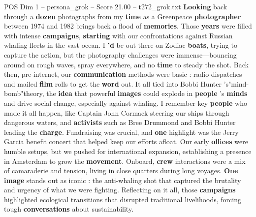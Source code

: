 \begin{textsample}{POS Dim 1 – persona\_grok – Score 21.00 – t272\_grok.txt}  \label{ex:f1_pos_031}
\textbf{Looking} back through a \textbf{dozen} photographs from my \textbf{time} as a Greenpeace \textbf{photographer} between 1974 and 1982 brings back a flood of \textbf{memories}.
Those \textbf{years} were filled with intense \textbf{campaigns}, \textbf{starting} with our confrontations against Russian whaling fleets in the vast ocean.
I \textbf{'d} be out there on Zodiac \textbf{boats}, trying to capture the action, but the photography challenges were immense—bouncing around on rough waves, spray everywhere, and no \textbf{time} to steady the shot.
Back then, pre-internet, our \textbf{communication} methods were basic : radio dispatches and mailed \textbf{film} rolls to get the \textbf{word} out.
It all tied into Bobbi Hunter 's"mind-bomb"theory, the \textbf{idea} that powerful \textbf{images} could explode in \textbf{people} 's \textbf{minds} and drive social change, especially against whaling.
I remember key \textbf{people} who made it all happen, like Captain John Cormack steering our ships through dangerous waters, and \textbf{activists} such as Bree Drummond and Bobbi Hunter leading the \textbf{charge}.
Fundraising was crucial, and \textbf{one} highlight was the Jerry Garcia benefit concert that helped keep our efforts afloat.
Our early \textbf{offices} were humble setups, but we pushed for international expansion, establishing a presence in Amsterdam to grow the \textbf{movement}.
Onboard, \textbf{crew} interactions were a mix of camaraderie and tension, living in close quarters during long voyages. \textbf{One} \textbf{image} stands out as iconic : the anti-whaling shot that captured the brutality and urgency of what we were fighting.
Reflecting on it all, those \textbf{campaigns} highlighted ecological transitions that disrupted traditional livelihoods, forcing tough \textbf{conversations} about sustainability.

\end{textsample}
